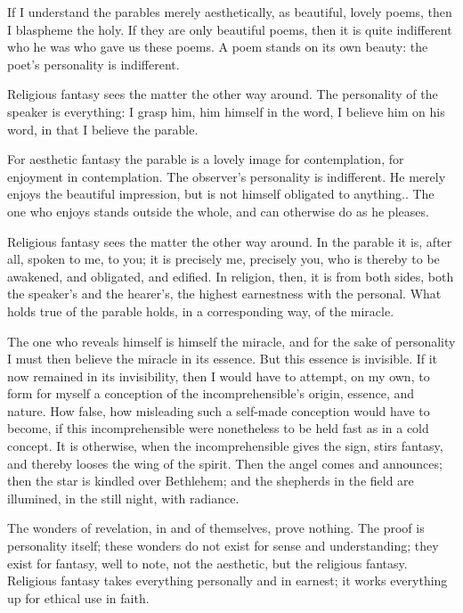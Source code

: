 \documentclass[12pt,a4paper]{book}
\begin{document}
If I understand the parables merely aesthetically, as beautiful, lovely poems, then I blaspheme the holy. If they are only beautiful poems, then it is quite indifferent who he was who gave us these poems. A poem stands on its own beauty: the poet's personality is indifferent.

Religious fantasy sees the matter the other way around. The personality of the speaker is everything: I grasp him, him himself in the word, I believe him on his word, in that I believe the parable.

For aesthetic fantasy the parable is a lovely image for contemplation, for enjoyment in contemplation. The observer's personality is indifferent. He merely enjoys the beautiful impression, but is not himself obligated to anything..
The one who enjoys stands outside the whole, and can otherwise do as he pleases.

Religious fantasy sees the matter the other way around. In the parable it is, after all, spoken to me, to you; it is precisely me, precisely you, who is thereby to be awakened, and obligated, and edified. In religion, then, it is from both sides, both the speaker's and the hearer's, the highest earnestness with the personal. What holds true of the parable holds, in a corresponding way, of the miracle.

The one who reveals himself is himself the miracle, and for the sake of personality I must then believe the miracle in its essence. But this essence is invisible. If it now remained in its invisibility, then I would have to attempt, on my own, to form for myself a conception of the incomprehensible's origin, essence, and nature. How false, how misleading such a self-made conception would have to become, if this incomprehensible were nonetheless to be held fast as in a cold concept.
It is otherwise, when the incomprehensible gives the sign, stirs fantasy, and thereby looses the wing of the spirit. Then the angel comes and announces; then the star is kindled over Bethlehem; and the shepherds in the field are illumined, in the still night, with radiance.

The wonders of revelation, in and of themselves, prove nothing. The proof is personality itself; these wonders do not exist for sense and understanding; they exist for fantasy, well to note, not the aesthetic, but the religious fantasy. Religious fantasy takes everything personally and in earnest; it works everything up for ethical use in faith.
\end{document}
